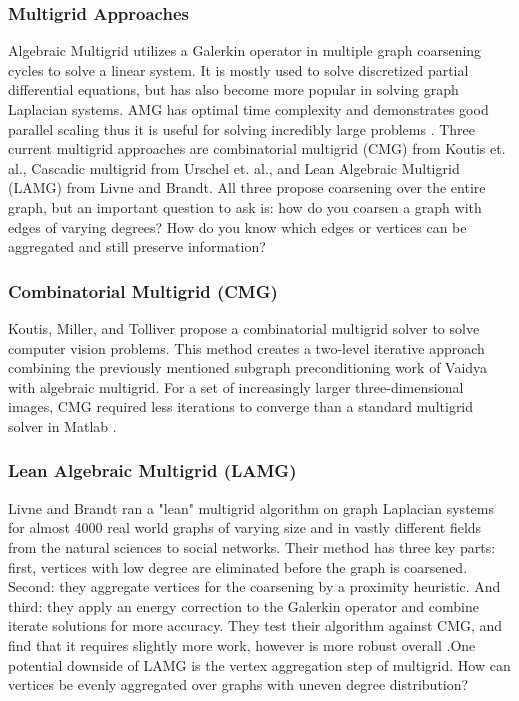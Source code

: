 \documentclass{article}
\begin{document}
\subsubsection{Multigrid Approaches}
Algebraic Multigrid utilizes a Galerkin operator in multiple graph coarsening cycles to solve a linear system. It is mostly used to solve discretized partial differential equations, but has also become more popular in solving graph Laplacian systems. AMG has optimal time complexity and demonstrates good parallel scaling thus it is useful for solving incredibly large problems \cite{Livne:2012}. Three current multigrid approaches are combinatorial multigrid (CMG) from Koutis et. al., Cascadic multigrid from Urschel et. al., and Lean Algebraic Multigrid (LAMG) from Livne and Brandt. All three propose coarsening over the entire graph, but an important question to ask is: how do you coarsen a graph with edges of varying degrees? How do you know which edges or vertices can be aggregated and still preserve information?


\subsubsection{Combinatorial Multigrid (CMG)}
Koutis, Miller, and Tolliver propose a combinatorial multigrid solver to solve computer vision problems. This method creates a two-level iterative approach combining the previously mentioned subgraph preconditioning work of Vaidya with algebraic multigrid. For a set of increasingly larger three-dimensional images, CMG required less iterations to converge than a standard multigrid solver in Matlab \cite{Koutis:2011}.

\subsubsection{Lean Algebraic Multigrid (LAMG)}
Livne and Brandt ran a "lean" multigrid algorithm on graph Laplacian systems for almost 4000 real world graphs of varying size and in vastly different fields from the natural sciences to social networks. Their method has three key parts: first, vertices with low degree are eliminated before the graph is coarsened. Second: they aggregate vertices for the coarsening by a proximity heuristic. And third: they apply an energy correction to the Galerkin operator and combine iterate solutions for more accuracy. They test their algorithm against CMG, and find that it requires slightly more work, however is more robust overall \cite{Livne:2012}.One potential downside of LAMG is the vertex aggregation step of multigrid. How can vertices be evenly aggregated over graphs with uneven degree distribution?
\end{document}

